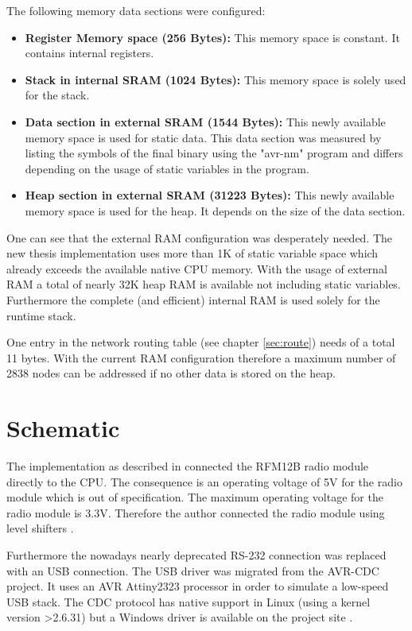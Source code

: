 The following memory data sections were configured:

\begin{itemize}
    \item \textbf{Register Memory space (256 Bytes):} This memory space is constant. It contains internal registers.
    \item \textbf{Stack in internal SRAM (1024 Bytes):} This memory space is solely used for the stack.
    \item \textbf{Data section in external SRAM (1544 Bytes):} This newly available memory space is used for static data. This data section was measured by listing the symbols of the final binary using the "avr-nm" program and differs depending on the usage of static variables in the program.
    \item \textbf{Heap section in external SRAM (31223 Bytes):} This newly available memory space is used for the heap. It depends on the size of the data section.
\end{itemize}

One can see that the external RAM configuration was desperately needed. The new thesis implementation uses more than 1K of static variable space which already exceeds the available native CPU memory. With the usage of external RAM a total of nearly 32K heap RAM is available not including static variables. Furthermore the complete (and efficient) internal RAM is used solely for the runtime stack.

One entry in the network routing table (see chapter \ref{sec:route}) needs of a total 11 bytes. With the current RAM configuration therefore a maximum number of 2838 nodes can be addressed if no other data is stored on the heap.

\section{Schematic}%
The implementation as described in \cite{korniowski} connected the RFM12B radio module directly to the CPU. The consequence is an operating voltage of 5V for the radio module which is out of specification. The maximum operating voltage for the radio module is 3.3V. Therefore the author connected the radio module using level shifters \cite{schutte}.

Furthermore the nowadays nearly deprecated RS-232 connection was replaced with an USB connection. The USB driver was migrated from the AVR-CDC \cite{avrcdc} project. It uses an AVR Attiny2323 processor in order to simulate a low-speed USB stack. The CDC protocol has native support in Linux (using a kernel version >2.6.31) but a Windows driver is available on the project site \cite{avrcdc}.

